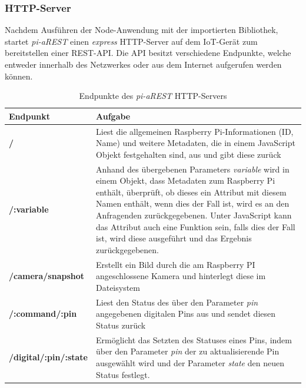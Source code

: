 \subsubsection{HTTP-Server}
Nachdem Ausführen der Node-Anwendung mit der importierten Bibliothek, startet \textit{pi-aREST} einen 
\textit{express} HTTP-Server auf dem IoT-Gerät zum bereitstellen einer REST-API. Die API besitzt
verschiedene Endpunkte, welche entweder innerhalb des Netzwerkes oder aus dem Internet aufgerufen werden
können.  \cite{piarestgtihub}

\begin{table}[h!]
  \footnotesize
  \centering
  \label{tab:security-threats}
  \begin{tabular}{p{4cm}p{9cm}}
    \textbf{Endpunkt} & \textbf{Aufgabe}\\
    \hline
    \textbf{/} & Liest die allgemeinen Raspberry Pi-Informationen (ID, Name) und weitere
		    Metadaten, die in einem JavaScript Objekt festgehalten sind, aus und gibt 
		   diese zurück  \\

    \textbf{/:variable} & Anhand des übergebenen Parameters \textit{variable} wird in einem 
				Objekt, dass Metadaten zum Raspberry Pi enthält, überprüft, ob dieses ein
				Attribut mit diesem Namen enthält, wenn dies der Fall ist, wird es an den
				Anfragenden zurückgegebenen. Unter JavaScript kann das Attribut auch
				eine Funktion sein, falls dies der Fall ist, wird diese ausgeführt und das 
				Ergebnis zurückgegebenen. \\

    \textbf{/camera/snapshot} & Erstellt ein Bild durch die am Raspberry PI angeschlossene Kamera 
					     und hinterlegt diese im Dateisystem  \\

    \textbf{/:command/:pin} & Liest den Status des über den Parameter \textit{pin} angegebenen digitalen
					Pins aus und sendet diesen Status zurück   \\

    \textbf{/digital/:pin/:state} & Ermöglicht das Setzten des Statuses eines Pins, indem über den Parameter 
					\textit{pin} der zu aktualisierende Pin ausgewählt wird und der Parameter
					\textit{state} den neuen Status festlegt.  \\
  \end{tabular}
  \caption{Endpunkte des \textit{pi-aREST} HTTP-Servers \cite{piarestgtihub}}
\end{table}

